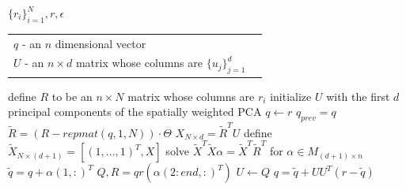 \documentclass[12pt]{article}
\theoremstyle{remark}
\begin{document}
\begin{algorithm}
\caption{Step 1: in practice}
\label{alg:step1Inpractice_clean}
\begin{algorithmic}[1]
 $\lbrace r_i \rbrace_{i=1}^N, r, \epsilon$
\begin{tabular}[t]{ll}
                         $q$ - an $n$ dimensional vector \\
                         $U$ - an $n\times d$ matrix whose columns are $\lbrace u_j \rbrace_{j=1}^d$ 
                         \end{tabular}
\State define $R$ to be an $n\times N$ matrix whose columns are $r_i$
\State initialize $U$ with the first $d$ principal components of the spatially weighted PCA \label{algstep:U_init_in_practice}
\State $q\leftarrow r$
\Repeat
    \State $q_{prev} = q$
    \State $\tilde{R} = (R - repmat(q,1,N))\cdot \Theta$ 
    \State $X_{N\times d} = \tilde{R}^T U$ 
    \State define $\tilde{X}_{N\times (d+1)} = \left[(1,...,1)^T, X\right]$
    \State solve $\tilde{X}^T\tilde{X}\alpha = \tilde{X}^T \tilde{R}^T$ for $\alpha \in M_{(d+1)\times n}$ 
    \State $\tilde{q} = q + \alpha(1,:)^T$
    \State $Q, \hat{R} = qr(\alpha(2:end, :)^T)$ 
    \State $U \leftarrow Q$
    \State $q = \tilde{q} + U U^T (r-\tilde{q})$
\end{algorithmic}
\end{algorithm}
\end{document}
